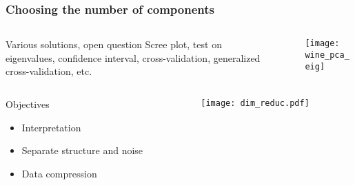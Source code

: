 \begin{frame}
  \frametitle{Choosing the number of components}

  \begin{columns}
  \begin{column}{0.68\textwidth}
    \begin{block}{Various solutions, open question}
    Scree plot, test on eigenvalues, confidence interval, cross-validation, generalized cross-validation, etc.
    \end{block}
  \end{column}~~
  \begin{column}{0.3\textwidth}
    \texttt{[image: wine\_pca\_eig]}
  \end{column}
  \end{columns}
  
  \begin{columns}
  \begin{column}{.5\textwidth}
  \begin{block}{Objectives}
    \begin{itemize}
      \item Interpretation
      \item Separate structure and noise
      \item Data compression    
    \end{itemize}
  \end{block}
\end{column}
\begin{column}{0.5\textwidth}
\texttt{[image: dim\_reduc.pdf]}
  \end{column}
  \end{columns}
\end{frame}

